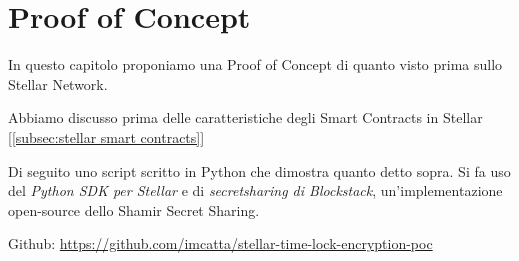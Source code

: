 \chapter{Proof of Concept}

In questo capitolo proponiamo una Proof of Concept di quanto visto prima sullo Stellar Network. 


Abbiamo discusso prima delle caratteristiche degli Smart Contracts in Stellar 
[\ref{subsec:stellar smart contracts}]

Di seguito uno script scritto in Python che dimostra quanto detto sopra.
Si fa uso del \textit{Python SDK per Stellar} e di
\textit{secretsharing di Blockstack}, un'implementazione open-source dello
Shamir Secret Sharing.


Github:
\url{https://github.com/imcatta/stellar-time-lock-encryption-poc}